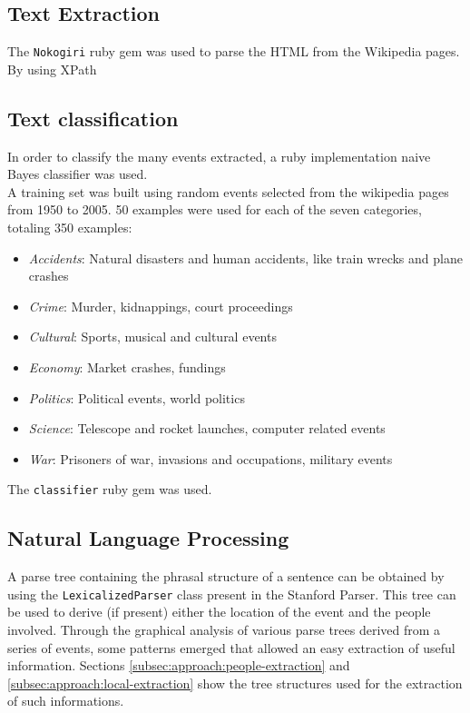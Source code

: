 \documentclass{llncs}
\begin{document}
\subsection{Text Extraction}

The \verb!Nokogiri! ruby gem was used to parse the HTML from the Wikipedia pages. By using XPath

\subsection{Text classification}
\label{subsec:approach:text-classification}

In order to classify the many events extracted, a ruby implementation naive Bayes classifier was used.\\

A training set was built using random events selected from the wikipedia pages from 1950 to 2005. 50 examples were used for each of the seven categories, totaling 350 examples:

\begin{itemize}
	\item \textit{Accidents}: Natural disasters and human accidents, like train wrecks and plane crashes
	\item \textit{Crime}: Murder, kidnappings, court proceedings
	\item \textit{Cultural}: Sports, musical and cultural events
	\item \textit{Economy}: Market crashes, fundings
	\item \textit{Politics}: Political events, world politics
	\item \textit{Science}: Telescope and rocket launches, computer related events
	\item \textit{War}: Prisoners of war, invasions and occupations, military events
\end{itemize}

The \verb!classifier! ruby gem was used.

\subsection{Natural Language Processing}

A parse tree containing the phrasal structure of a sentence can be obtained by using the \verb!LexicalizedParser! class present in the Stanford Parser. This tree can be used to derive (if present) either the location of the event and the people involved. Through the graphical analysis of various parse trees derived from a series of events, some patterns emerged that allowed an easy extraction of useful information. Sections \ref{subsec:approach:people-extraction} and \ref{subsec:approach:local-extraction} show the tree structures used for the extraction of such informations.\cite{santorini}\cite{bies}\\
\end{document}
